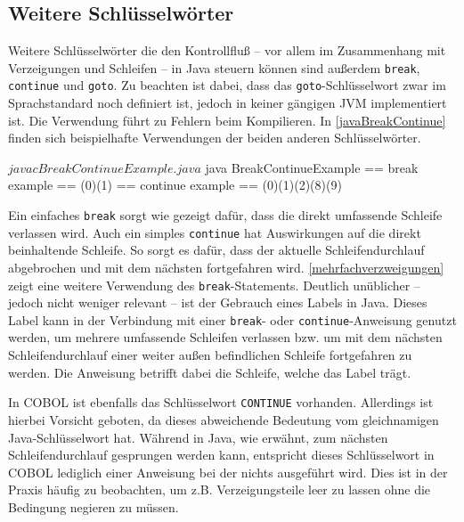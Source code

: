
\subsection{Weitere Schlüsselwörter}

Weitere Schlüsselwörter die den Kontrollfluß -- vor allem im Zusammenhang mit Verzeigungen und Schleifen -- in Java steuern können sind außerdem \texttt{break}, \texttt{continue} und \texttt{goto}. Zu beachten ist dabei, dass das \texttt{goto}-Schlüsselwort zwar im Sprachstandard noch definiert ist, jedoch in keiner gängigen JVM implementiert ist. Die Verwendung führt zu Fehlern beim Kompilieren. In \autoref{javaBreakContinue} finden sich beispielhafte Verwendungen der beiden anderen Schlüsselwörter.

\sepCodeAndOutputCheck
\begin{shellwindow}
$ javac BreakContinueExample.java 
$ java BreakContinueExample
== break example == 
(0)(1)
== continue example == 
(0)(1)(2)(8)(9)
\end{shellwindow}

Ein einfaches \texttt{break} sorgt wie gezeigt dafür, dass die direkt umfassende Schleife verlassen wird. Auch ein simples \texttt{continue} hat Auswirkungen auf die direkt beinhaltende Schleife. So sorgt es dafür, dass der aktuelle Schleifendurchlauf abgebrochen und mit dem nächsten fortgefahren wird. \autoref{mehrfachverzweigungen} zeigt eine weitere Verwendung des \texttt{break}-Statements. Deutlich unüblicher -- jedoch nicht weniger relevant -- ist der Gebrauch eines Labels in Java. Dieses Label kann in der Verbindung mit einer \texttt{break}- oder \texttt{continue}-Anweisung genutzt werden, um mehrere umfassende Schleifen verlassen bzw. um mit dem nächsten Schleifendurchlauf einer weiter außen befindlichen Schleife fortgefahren zu werden. Die Anweisung betrifft dabei die Schleife, welche das Label trägt. 

In COBOL ist ebenfalls das Schlüsselwort \texttt{CONTINUE} vorhanden. Allerdings ist hierbei Vorsicht geboten, da dieses abweichende Bedeutung vom gleichnamigen Java-Schlüsselwort hat. Während in Java, wie erwähnt, zum nächsten Schleifendurchlauf gesprungen werden kann, entspricht dieses Schlüsselwort in COBOL lediglich einer Anweisung bei der nichts ausgeführt wird. Dies ist in der Praxis häufig zu beobachten, um z.B. Verzeigungsteile leer zu lassen ohne die Bedingung negieren zu müssen.

